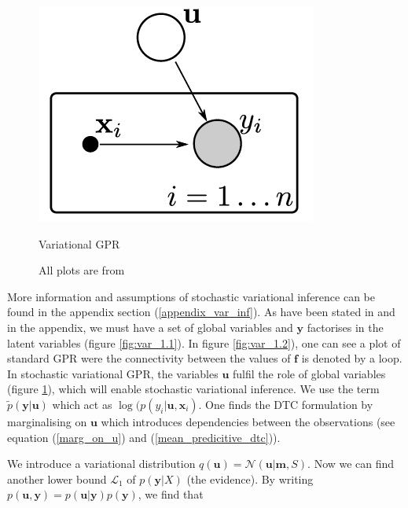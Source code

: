\documentclass[12pt,a4paper,oneside]{book}
\begin{document}
\begin{figure}[!htb]
\begin{minipage}{0.31\textwidth}
   \end{minipage}\hfill
   \begin {minipage}{0.31\textwidth}
     \centering
     \includegraphics[width=1.1\linewidth]{plot_variational_regression}
     \caption{Variational GPR}\label{fig:var_1.3}
   \end{minipage}
   \caption*{All plots are from \cite{hensman2013gaussian}}
\end{figure}


More information and assumptions of stochastic variational inference can be found in the appendix section (\ref{appendix_var_inf}). As have been stated in \cite{hensman2013gaussian} and in the appendix, we must have a set of global variables and $\bm{y}$ factorises in the latent variables (figure \ref{fig:var_1.1}). In figure \ref{fig:var_1.2}), one can see a plot of standard GPR were the connectivity between the values of $\bm{f}$ is denoted by a loop. In stochastic variational GPR, the variables $\bm{u}$ fulfil the role of global variables (figure \ref{fig:var_1.3}), which will enable stochastic variational inference. We use the term $\tilde{p}(\bm{y}|\bm{u})$ which act as $\log(p(y_i | \bm{u}, \bm{x}_i)$.  One finds the DTC formulation by marginalising on $\bm{u}$ which introduces dependencies between the observations (see equation (\ref{marg_on_u}) and (\ref{mean_predicitive_dtc})).

We introduce a variational distribution $q(\bm{u}) = \mathcal{N}(\bm{u}|\bm{m},S)$. Now we can find another lower bound $\mathcal{L}_1$ of $p(\bm{y}|X)$ (the evidence). By writing $p(\bm{u},\bm{y}) = p(\bm{u}|\bm{y}) p(\bm{y})$, we find that 
\end{document}
